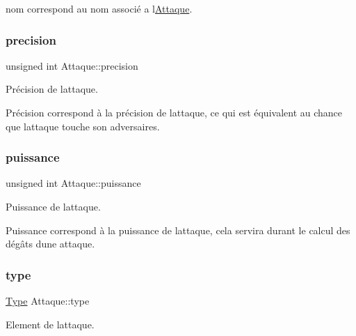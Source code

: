 nom correspond au nom associé a l\textquotesingle{}\hyperlink{class_attaque}{Attaque}. \mbox{\label{class_attaque_a221655b057b96a0cd5eb58309b99c8dd}} 
\subsubsection{\texorpdfstring{precision}{precision}}
{\footnotesize\ttfamily unsigned int Attaque\+::precision\hspace{0.3cm}{\ttfamily [private]}}



Précision de l\textquotesingle{}attaque. 

Précision correspond à la précision de l\textquotesingle{}attaque, ce qui est équivalent au chance que l\textquotesingle{}attaque touche son adversaires. \mbox{\label{class_attaque_acfa274f467927adfb0a99ecf009d9490}} 
\subsubsection{\texorpdfstring{puissance}{puissance}}
{\footnotesize\ttfamily unsigned int Attaque\+::puissance\hspace{0.3cm}{\ttfamily [private]}}



Puissance de l\textquotesingle{}attaque. 

Puissance correspond à la puissance de l\textquotesingle{}attaque, cela servira durant le calcul des dégâts d\textquotesingle{}une attaque. \mbox{\label{class_attaque_a0a681a8a1fcefacefc6386c151cab12d}} 
\subsubsection{\texorpdfstring{type}{type}}
{\footnotesize\ttfamily \hyperlink{_attaque_8h_a1d1cfd8ffb84e947f82999c682b666a7}{Type} Attaque\+::type\hspace{0.3cm}{\ttfamily [private]}}



Element de l\textquotesingle{}attaque. 

